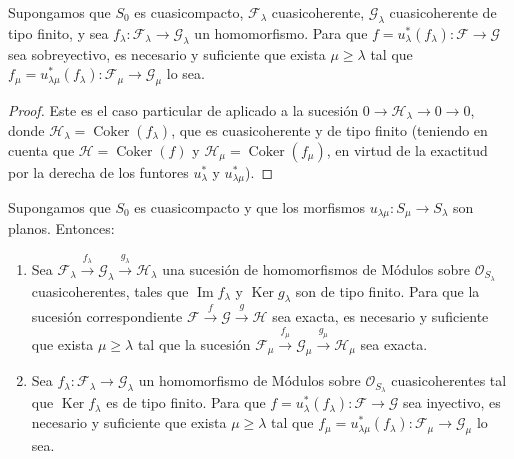 \begin{corollary}[8.5.7]
\label{IV.8.5.7-fr}
Supongamos que $S_0$ es cuasicompacto, $\mathcal F_\lambda$ cuasicoherente, $\mathcal G_\lambda$ cuasicoherente de tipo finito, y sea $f_\lambda:\mathcal F_\lambda\to\mathcal G_\lambda$ un homomorfismo.
Para que $f=u_\lambda^*(f_\lambda):\mathcal F\to\mathcal G$ sea sobreyectivo, es necesario y suficiente que exista $\mu\geq\lambda$ tal que $f_\mu=u_{\lambda\mu}^*(f_\lambda):\mathcal F_\mu\to\mathcal G_\mu$ lo sea.
\end{corollary}

\begin{proof}
Este es el caso particular de  aplicado a la sucesión $0\to\mathcal H_\lambda\to0\to0$, donde $\mathcal H_\lambda=\operatorname{Coker}(f_\lambda)$, que es cuasicoherente y de tipo finito (teniendo en cuenta que $\mathcal H=\operatorname{Coker}(f)$ y $\mathcal H_\mu=\operatorname{Coker}(f_\mu)$, en virtud de la exactitud por la derecha de los funtores $u_\lambda^*$ y $u_{\lambda\mu}^*$).
\end{proof}

\begin{corollary}[8.5.8]
Supongamos que $S_0$ es cuasicompacto y que los morfismos $u_{\lambda\mu}:S_\mu\to S_\lambda$ son \textup{planos}.
Entonces:
\begin{enumerate}[label=\textup{(\roman*)}]
  \item Sea $\mathcal F_\lambda\xrightarrow{f_\lambda}\mathcal G_\lambda
  \xrightarrow{g_\lambda}\mathcal H_\lambda$ una sucesión de homomorfismos de Módulos sobre $\mathcal O_{S_\lambda}$ cuasicoherentes, tales que $\operatorname{Im}f_\lambda$ y $\operatorname{Ker}g_\lambda$ son de tipo finito.
Para que la sucesión correspondiente $\mathcal F\xrightarrow{f}\mathcal G\xrightarrow{g}\mathcal H$ sea
exacta, es necesario y suficiente que exista $\mu\geq\lambda$ tal que la sucesión $\mathcal F_\mu\xrightarrow{f_\mu}\mathcal G_\mu
  \xrightarrow{g_\mu}\mathcal H_\mu$ sea exacta.
  \item Sea $f_\lambda:\mathcal F_\lambda\to\mathcal G_\lambda$ un homomorfismo de Módulos sobre $\mathcal O_{S_\lambda}$ cuasicoherentes tal que $\operatorname{Ker}f_\lambda$ es de tipo finito.
Para que $f=u_\lambda^*(f_\lambda):\mathcal F\to\mathcal G$ sea inyectivo, es necesario y suficiente que exista $\mu\geq\lambda$ tal que $f_\mu=u_{\lambda\mu}^*(f_\lambda):\mathcal F_\mu\to\mathcal G_\mu$ lo sea.
\end{enumerate}
\end{corollary}


